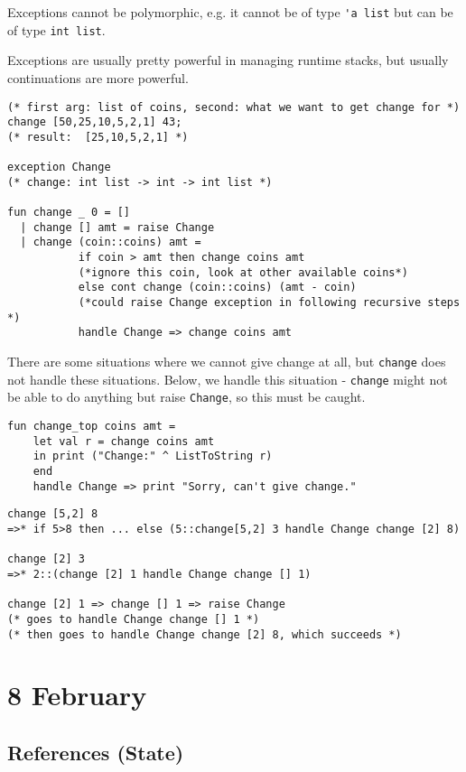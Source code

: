 \documentclass[11pt]{article}
\begin{document}
Exceptions cannot be polymorphic, e.g. it cannot be of type \verb~'a list~ but can be of type \verb~int list~.

Exceptions are usually pretty powerful in managing runtime stacks, but usually continuations are more powerful.

\begin{verbatim}
(* first arg: list of coins, second: what we want to get change for *)
change [50,25,10,5,2,1] 43;
(* result:  [25,10,5,2,1] *)

exception Change 
(* change: int list -> int -> int list *)

fun change _ 0 = []
  | change [] amt = raise Change
  | change (coin::coins) amt = 
           if coin > amt then change coins amt  
           (*ignore this coin, look at other available coins*)
           else cont change (coin::coins) (amt - coin) 
           (*could raise Change exception in following recursive steps *)
           handle Change => change coins amt

\end{verbatim}

There are some situations where we cannot give change at all, but \verb~change~ does not handle these situations. Below, we handle this situation - \verb~change~ might not be able to do anything but raise \verb~Change~, so this must be caught.

\begin{verbatim}
fun change_top coins amt =
    let val r = change coins amt
    in print ("Change:" ^ ListToString r)
    end
    handle Change => print "Sorry, can't give change."
\end{verbatim}

\begin{verbatim}
change [5,2] 8
=>* if 5>8 then ... else (5::change[5,2] 3 handle Change change [2] 8)

change [2] 3 
=>* 2::(change [2] 1 handle Change change [] 1)

change [2] 1 => change [] 1 => raise Change
(* goes to handle Change change [] 1 *)
(* then goes to handle Change change [2] 8, which succeeds *)
\end{verbatim}

\section{8 February}
\subsection{References (State)}
\end{document}
